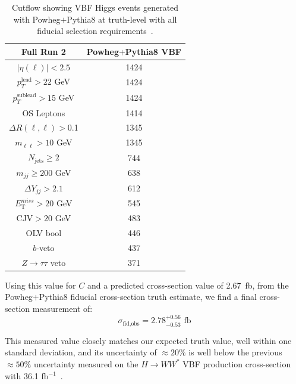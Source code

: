 \begin{table}[!ht]
\centering
\begin{tabular}{c||c}
\textbf{Full Run 2} & \textbf{Powheg$+$Pythia8 VBF} \\
\hline
$|\eta(\ell)|<2.5$ & 1424 \\
$p_T^{\text{lead}}>22$ GeV &1424 \\
$p_T^{\text{sublead}}>15$ GeV & 1424\\
OS Leptons & 1414 \\
$\Delta R(\ell,\ell) >$0.1 & 1345 \\
$m_{\ell\ell}>10$ GeV & 1345  \\
$N_{\text{jets}}\geq2$ & 744\\
$m_{jj} \geq 200$ GeV & 638  \\
$\Delta Y_{jj}>2.1$ & 612  \\
$E_{\text{T}}^{miss}>20$ GeV & 545  \\
CJV$>20$ GeV & 483 \\
OLV bool & 446  \\
$b$-veto & 437  \\
$Z\rightarrow\tau\tau$ veto & 371 \\
\hline
\end{tabular}
\caption{Cutflow showing VBF Higgs events generated with Powheg$+$Pythia8 at truth-level with all fiducial selection requirements~\cite{ourSupportNote}. }
\label{tab:truth}
\end{table}

Using this value for $C$ and a predicted cross-section value of 2.67~fb, from the Powheg$+$Pythia8 fiducial cross-section truth estimate, we find a final cross-section measurement of:
\begin{equation}
\sigma_{\text{fid,obs}} = 2.78^{+0.56}_{-0.53} \text{ fb} 
\end{equation}

This measured value closely matches our expected truth value, well within one standard deviation, and its uncertainty of $\approx20\%$ is well below the previous $\approx50\%$ uncertainty measured on the $H\rightarrow WW^*$ VBF production cross-section with 36.1 fb$^{-1}$~\cite{Aaboud_2019}. 


